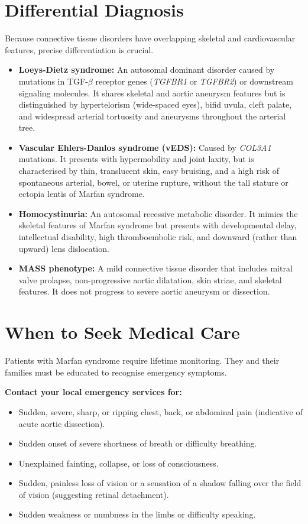 \section*{Differential Diagnosis}
Because connective tissue disorders have overlapping skeletal and cardiovascular features, precise differentiation is crucial.
\begin{itemize}
    \item \textbf{Loeys-Dietz syndrome:} An autosomal dominant disorder caused by mutations in TGF-$\beta$ receptor genes (\textit{TGFBR1} or \textit{TGFBR2}) or downstream signaling molecules. It shares skeletal and aortic aneurysm features but is distinguished by hypertelorism (wide-spaced eyes), bifid uvula, cleft palate, and widespread arterial tortuosity and aneurysms throughout the arterial tree.
    \item \textbf{Vascular Ehlers-Danlos syndrome (vEDS):} Caused by \textit{COL3A1} mutations. It presents with hypermobility and joint laxity, but is characterised by thin, translucent skin, easy bruising, and a high risk of spontaneous arterial, bowel, or uterine rupture, without the tall stature or ectopia lentis of Marfan syndrome.
    \item \textbf{Homocystinuria:} An autosomal recessive metabolic disorder. It mimics the skeletal features of Marfan syndrome but presents with developmental delay, intellectual disability, high thromboembolic risk, and downward (rather than upward) lens dislocation.
    \item \textbf{MASS phenotype:} A mild connective tissue disorder that includes mitral valve prolapse, non-progressive aortic dilatation, skin striae, and skeletal features. It does not progress to severe aortic aneurysm or dissection.
\end{itemize}

\section*{When to Seek Medical Care}
Patients with Marfan syndrome require lifetime monitoring. They and their families must be educated to recognise emergency symptoms.

\textbf{Contact your local emergency services for:}
\begin{itemize}
    \item Sudden, severe, sharp, or ripping chest, back, or abdominal pain (indicative of acute aortic dissection).
    \item Sudden onset of severe shortness of breath or difficulty breathing.
    \item Unexplained fainting, collapse, or loss of consciousness.
    \item Sudden, painless loss of vision or a sensation of a shadow falling over the field of vision (suggesting retinal detachment).
    \item Sudden weakness or numbness in the limbs or difficulty speaking.
\end{itemize}

